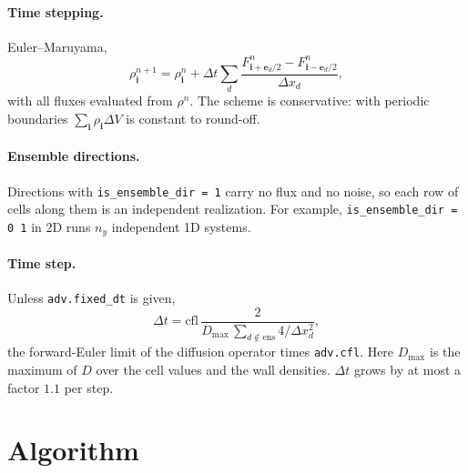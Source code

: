\documentclass[11pt]{article}
\newcommand{\code}[1]{\texttt{#1}}
\begin{document}
\paragraph{Time stepping.}
Euler--Maruyama,
\begin{equation}\label{eq:update}
  \rho_{\mathbf i}^{n+1} = \rho_{\mathbf i}^{n}
   + \Delta t \sum_d \frac{F^n_{\mathbf i+\mathbf e_d/2}-F^n_{\mathbf i-\mathbf e_d/2}}{\Delta x_d},
\end{equation}
with all fluxes evaluated from $\rho^n$. The scheme is conservative: with
periodic boundaries $\sum_{\mathbf i}\rho_{\mathbf i}\Delta V$ is constant to
round-off.

\paragraph{Ensemble directions.}
Directions with \code{is\_ensemble\_dir = 1} carry no flux and no noise, so
each row of cells along them is an independent realization. For example,
\code{is\_ensemble\_dir = 0 1} in 2D runs $n_y$ independent 1D systems.

\paragraph{Time step.}
Unless \code{adv.fixed\_dt} is given,
\begin{equation}
  \Delta t = \mathrm{cfl}\,\frac{2}{D_{\max}\,\sum_{d\notin\mathrm{ens}} 4/\Delta x_d^2},
\end{equation}
the forward-Euler limit of the diffusion operator times \code{adv.cfl}.
Here $D_{\max}$ is the maximum of $D$ over the cell values and the wall
densities. $\Delta t$ grows by at most a factor $1.1$ per step.

\section{Algorithm}
\end{document}
